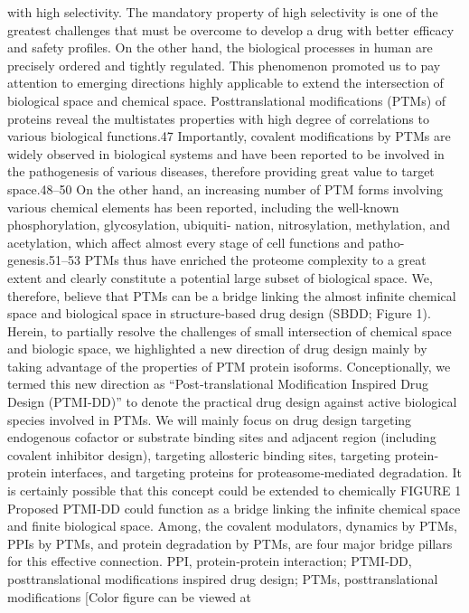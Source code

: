 with high selectivity. The mandatory property of high selectivity is one of the greatest challenges that must be
overcome to develop a drug with better efficacy and safety profiles. On the other hand, the biological processes in
human are precisely ordered and tightly regulated. This phenomenon promoted us to pay attention to emerging
directions highly applicable to extend the intersection of biological space and chemical space.
Posttranslational modifications (PTMs) of proteins reveal the multistates properties with high degree of
correlations to various biological functions.47 Importantly, covalent modifications by PTMs are widely observed in
biological systems and have been reported to be involved in the pathogenesis of various diseases, therefore
providing great value to target space.48–50 On the other hand, an increasing number of PTM forms involving
various chemical elements has been reported, including the well‐known phosphorylation, glycosylation, ubiquiti-
nation, nitrosylation, methylation, and acetylation, which affect almost every stage of cell functions and patho-
genesis.51–53 PTMs thus have enriched the proteome complexity to a great extent and clearly constitute a potential
large subset of biological space. We, therefore, believe that PTMs can be a bridge linking the almost infinite
chemical space and biological space in structure‐based drug design (SBDD; Figure 1).
Herein, to partially resolve the challenges of small intersection of chemical space and biologic space, we
highlighted a new direction of drug design mainly by taking advantage of the properties of PTM protein isoforms.
Conceptionally, we termed this new direction as “Post‐translational Modification Inspired Drug Design (PTMI‐DD)”
to denote the practical drug design against active biological species involved in PTMs. We will mainly focus on drug
design targeting endogenous cofactor or substrate binding sites and adjacent region (including covalent inhibitor
design), targeting allosteric binding sites, targeting protein‐protein interfaces, and targeting proteins for
proteasome‐mediated degradation. It is certainly possible that this concept could be extended to chemically
FIGURE 1
Proposed PTMI‐DD could function as a bridge linking the infinite chemical space and finite biological
space. Among, the covalent modulators, dynamics by PTMs, PPIs by PTMs, and protein degradation by PTMs, are
four major bridge pillars for this effective connection. PPI, protein‐protein interaction; PTMI‐DD, posttranslational
modifications inspired drug design; PTMs, posttranslational modifications [Color figure can be viewed at
